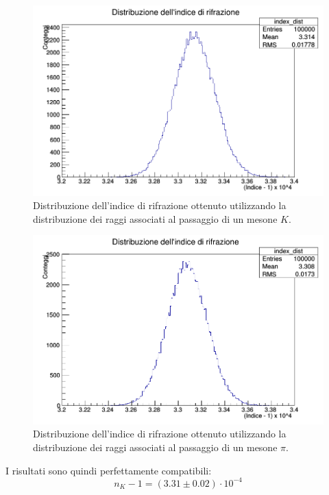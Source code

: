 \documentclass[8pt]{extarticle}
\begin{document}
\begin{figure}
\begin{center}
\includegraphics[scale=0.4]{indiceK_definitivo}
\caption{Distribuzione dell'indice di rifrazione ottenuto utilizzando la distribuzione dei raggi associati al passaggio di un mesone $K$.}
\label{fig:indiceK}
\end{center}
\end{figure}

\begin{figure}
\begin{center}
\includegraphics[scale=0.4]{indicePI_definitivo}
\caption{Distribuzione dell'indice di rifrazione ottenuto utilizzando la distribuzione dei raggi associati al passaggio di un mesone $\pi$.}
\label{fig:indicePI}
\end{center}
\end{figure}

I risultati sono quindi perfettamente compatibili: \\
\begin{equation}
n_K -1 = (3.31 \pm 0.02) \cdot 10^{-4}
\nonumber
\end{equation}
\end{document}
